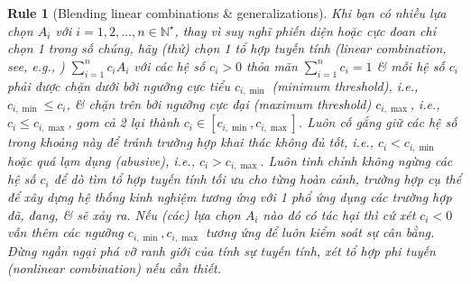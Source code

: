 \documentclass[12pt]{article}
\newtheorem{Rule}{Rule}
\begin{document}
\begin{Rule}[Blending linear combinations \& generalizations]
	Khi bạn có nhiều lựa chọn $A_i$ với $i = 1,2,\ldots,n\in\mathbb{N}^\star$, thay vì suy nghĩ phiến diện hoặc cực đoan chỉ chọn 1 trong số chúng, hãy (thử) chọn 1 tổ hợp tuyến tính (linear combination, see, e.g., {\rm\cite{Hung_linear_algebra,Trefethen_Bau1997,Trefethen_Bau2022}}) $\sum_{i = 1}^n c_iA_i$ với các hệ số $c_i > 0$ thỏa mãn $\sum_{i = 1}^n c_i = 1$ \& mỗi hệ số $c_i$ phải được chặn dưới bởi ngưỡng cực tiểu $c_{i,\min}$ (minimum threshold), i.e., $c_{i,\min}\le c_i$, \& chặn trên bởi ngưỡng cực đại (maximum threshold) $c_{i,\max}$, i.e., $c_i\le c_{i,\max}$, gom cả 2 lại thành $c_i\in[c_{i,\min},c_{i,\max}]$. Luôn cố gắng giữ các hệ số trong khoảng này để tránh trường hợp khai thác không đủ tốt, i.e., $c_i < c_{i,\min}$ hoặc quá lạm dụng (abusive), i.e., $c_i > c_{i,\max}$. Luôn tinh chỉnh không ngừng các hệ số $c_i$ để dò tìm tổ hợp tuyến tính tối ưu cho từng hoàn cảnh, trường hợp cụ thể để xây dựng hệ thống kinh nghiệm tương ứng với 1 phổ ứng dụng các trường hợp đã, đang, \& sẽ xảy ra. Nếu (các) lựa chọn $A_i$ nào đó có tác hại thì cứ xét $c_i < 0$ vẫn thêm các ngưỡng $c_{i,\min},c_{i,\max}$ tương ứng để luôn kiểm soát sự cân bằng. Đừng ngần ngại phá vỡ ranh giới của tính sự tuyến tính, xét tổ hợp phi tuyến (nonlinear combination) nếu cần thiết.
\end{Rule}
\end{document}
